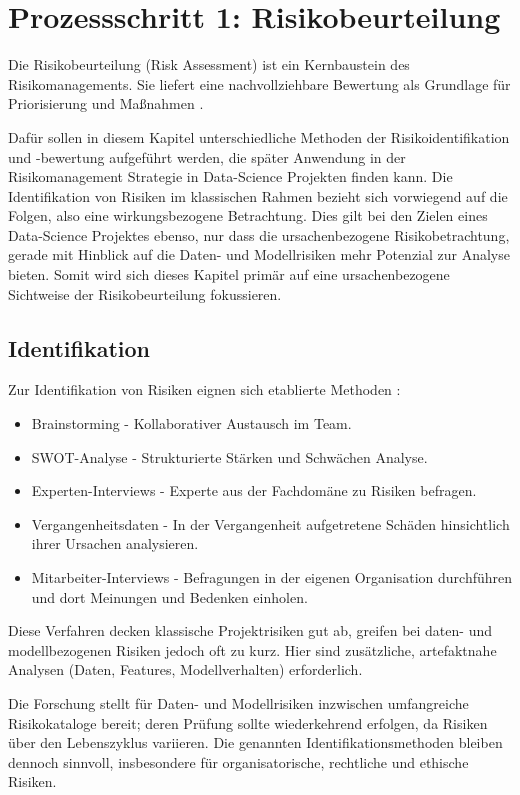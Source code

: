 \section{Prozessschritt 1: Risikobeurteilung} \label{sec:methode1}
Die Risikobeurteilung (Risk Assessment) ist ein Kernbaustein des Risikomanagements.
Sie liefert eine nachvollziehbare Bewertung als Grundlage für Priorisierung und Maßnahmen \citep{walder_risikomanagement_2017}.

Dafür sollen in diesem Kapitel unterschiedliche Methoden der Risikoidentifikation und -bewertung aufgeführt werden, die später Anwendung in 
der Risikomanagement Strategie in Data-Science Projekten finden kann. Die Identifikation von Risiken im klassischen Rahmen bezieht sich 
vorwiegend auf die Folgen, also eine wirkungsbezogene Betrachtung. Dies gilt bei den Zielen eines Data-Science Projektes ebenso, nur
dass die ursachenbezogene Risikobetrachtung, gerade mit Hinblick auf die Daten- und Modellrisiken mehr Potenzial zur Analyse bieten.
Somit wird sich dieses Kapitel primär auf eine ursachenbezogene Sichtweise der Risikobeurteilung fokussieren.

\subsection{Identifikation}
Zur Identifikation von Risiken eignen sich etablierte Methoden \citep{blender_risiken_2025}:
\begin{itemize}
    \item Brainstorming - Kollaborativer Austausch im Team.
    \item SWOT-Analyse - Strukturierte Stärken und Schwächen Analyse.
    \item Experten-Interviews - Experte aus der Fachdomäne zu Risiken befragen.
    \item Vergangenheitsdaten - In der Vergangenheit aufgetretene Schäden hinsichtlich ihrer Ursachen analysieren.
    \item Mitarbeiter-Interviews - Befragungen in der eigenen Organisation durchführen und dort Meinungen und Bedenken einholen.
\end{itemize}
Diese Verfahren decken klassische Projektrisiken gut ab, greifen bei daten- und modellbezogenen Risiken jedoch oft zu kurz.
Hier sind zusätzliche, artefaktnahe Analysen (Daten, Features, Modellverhalten) erforderlich.

Die Forschung stellt für Daten- und Modellrisiken inzwischen umfangreiche Risikokataloge bereit;
deren Prüfung sollte wiederkehrend erfolgen, da Risiken über den Lebenszyklus variieren.
Die genannten Identifikationsmethoden bleiben dennoch sinnvoll, insbesondere für organisatorische, rechtliche und ethische Risiken.

